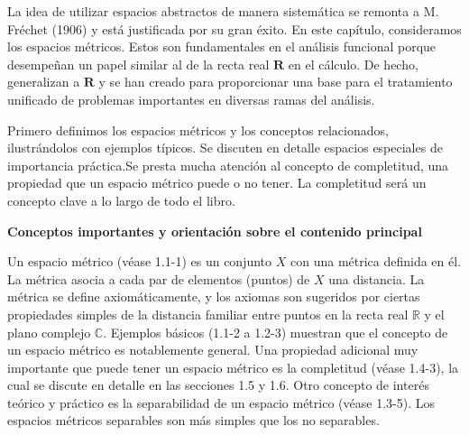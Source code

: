 {La idea de utilizar espacios abstractos de manera sistemática se remonta a M. Fréchet (1906) y está justificada por su gran éxito. En este capítulo, consideramos los espacios métricos. Estos son fundamentales en el análisis funcional porque desempeñan un papel similar al de la recta real $\mathbf{R}$ en el cálculo. De hecho, generalizan a $\mathbf{R}$ y se han creado para proporcionar una base para el tratamiento unificado de problemas importantes en diversas ramas del análisis.

Primero definimos los espacios métricos y los conceptos relacionados, ilustrándolos con ejemplos típicos. Se discuten en detalle espacios especiales de importancia práctica.Se presta mucha atención al concepto de completitud, una propiedad que un espacio métrico puede o no tener. La completitud será un concepto clave a lo largo de todo el libro.


{\textbf{Conceptos importantes y orientación sobre el contenido principal}}


Un espacio métrico (véase 1.1-1) es un conjunto $X$ con una métrica definida en él. La métrica asocia a cada par de elementos (puntos) de $X$ una distancia. La métrica se define axiomáticamente, y los axiomas son sugeridos por ciertas propiedades simples de la distancia familiar entre puntos en la recta real $\mathbb{R}$ y el plano complejo $\mathbb{C}$. Ejemplos básicos (1.1-2 a 1.2-3) muestran que el concepto de un espacio métrico es notablemente general. Una propiedad adicional muy importante que puede tener un espacio métrico es la completitud (véase 1.4-3), la cual se discute en detalle en las secciones 1.5 y 1.6. Otro concepto de interés teórico y práctico es la separabilidad de un espacio métrico (véase 1.3-5). Los espacios métricos separables son más simples que los no separables.
}


